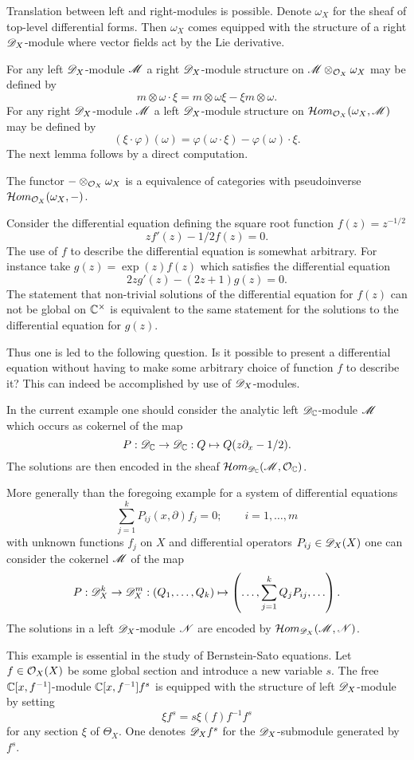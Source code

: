 Translation between left and right-modules is possible.
Denote $\omega_X$ for the sheaf of top-level differential forms.
Then $\omega_X$ comes equipped with the structure of a right $\mathscr{D}_X$-module where vector fields act by the Lie derivative.

For any left $\mathscr{D}_X$-module $\mathscr{M}$ a right $\mathscr{D}_X$-module structure on $\mathscr{M}\otimes_{\mathcal{O}_X}\omega_X$ may be defined by
$$m\otimes \omega \cdot \xi = m\otimes \omega\xi - \xi m \otimes \omega.$$
For any right $\mathscr{D}_X$-module $\mathscr{M}$ a left $\mathscr{D}_X$-module structure on $\mathcal{H}om_{\mathcal{O}_X}(\omega_X, \mathscr{M})$ may be defined by
$$(\xi\cdot \varphi)(\omega) = \varphi(\omega \cdot \xi) - \varphi(\omega)\cdot \xi. $$
The next lemma follows by a direct computation.
\begin{lemma}\label{lem: EquivalencLeftRight}
  The functor ${-}\otimes_{\mathcal{O}_X}\omega_X$ is a equivalence of categories with pseudoinverse  $\mathcal{H}om_{\mathcal{O}_X}(\omega_X,{-})$.
\end{lemma}
\begin{example}\label{ex: Solutions}
  Consider the differential equation defining the square root function $f(z)= z^{-1/2}$
  $$zf'(z) -1/2f(z) = 0.$$
  The use of $f$ to describe the differential equation is somewhat arbitrary.
  For instance take $g(z) = \exp(z)f(z)$ which satisfies the differential equation
  $$2z g'(z) -(2z + 1)g(z) = 0.$$
  The statement that non-trivial solutions of the differential equation for $f(z)$ can not be global on $\mathbb{C}^\times$ is equivalent to the same statement for the solutions to the differential equation for $g(z)$.

  Thus one is led to the following question.
  Is it possible to present a differential equation without having to make some arbitrary choice of function $f$ to describe it?
  This can indeed be accomplished by use of $\mathscr{D}_X$-modules.

  In the current example one should consider the analytic left $\mathscr{D}_{\mathbb{C}}$-module $\mathscr{M}$ which occurs as cokernel of the map
  $$P:\mathscr{D}_{\mathbb{C}} \to \mathscr{D}_{\mathbb{C}}: Q \mapsto  Q(z\partial_x -1/2).$$
  The solutions are then encoded in the sheaf $\mathcal{H}om_{\mathscr{D}_{\mathbb{C}}}(\mathscr{M},\mathcal{O}_{\mathbb{C}})$.
\end{example}
\begin{remark}\label{rem: Solutions}
  More generally than the foregoing example for a system of differential equations
  $$\sum_{j=1}^k P_{ij}(x,\partial) f_j = 0; \qquad i= 1,\ldots,m$$
  with unknown functions $f_j$ on $X$ and differential operators $P_{ij}\in \mathscr{D}_X(X)$
  one can consider the cokernel $\mathscr{M}$ of the map
  $$P:\mathscr{D}_X^k \to \mathscr{D}_X^m : \left(Q_1,\ldots, Q_k\right) \mapsto \left(\ldots, \sum_{j=1}^k Q_j P_{ij},\ldots\right).$$
  The solutions in a left $\mathscr{D}_X$-module $\mathscr{N}$ are encoded by $\mathcal{H}om_{\mathscr{D}_X}(\mathscr{M},\mathscr{N})$.
\end{remark}
\begin{example}\label{ex: fs}
  This example is essential in the study of Bernstein-Sato equations.
  Let $f\in \mathcal{O}_X(X)$ be some global section and introduce a new variable $s$.
  The free $\mathbb{C}[x,f^{-1}]$-module $\mathbb{C}[x,f^{-1}]f^s$ is equipped with the structure of left $\mathscr{D}_X$-module by setting
  $$\xi f^s = s \xi(f)f^{-1}f^{s}$$
  for any section $\xi$ of $\Theta_X$.
  One denotes $\mathscr{D}_Xf^s$ for the $\mathscr{D}_X$-submodule generated by $f^s$.
\end{example}
